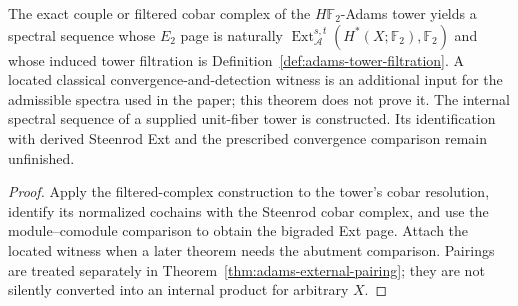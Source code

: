 \begin{theorem}
  \label{thm:adams-tower-ext-comparison}
  \notready
  The exact couple or filtered cobar complex of the
  $H\mathbb F_2$-Adams tower yields a spectral sequence whose $E_2$ page is
  naturally
  $\operatorname{Ext}_{\mathcal A}^{s,t}
  (H^*(X;\mathbb F_2),\mathbb F_2)$ and whose induced tower filtration is
  Definition~\ref{def:adams-tower-filtration}.  A located classical
  convergence-and-detection witness is an additional input for the admissible
  spectra used in the paper; this theorem does not prove it.
  The internal spectral sequence of a supplied unit-fiber tower is
  constructed. Its identification with derived Steenrod Ext and the
  prescribed convergence comparison remain unfinished.
\end{theorem}

\begin{proof}
  Apply the filtered-complex construction to the tower's cobar resolution,
  identify its normalized cochains with the Steenrod cobar complex, and use
  the module--comodule comparison to obtain the bigraded Ext page.  Attach the
  located witness when a later theorem needs the abutment comparison.  Pairings
  are treated separately in Theorem~\ref{thm:adams-external-pairing}; they are
  not silently converted into an internal product for arbitrary $X$.
\end{proof}

